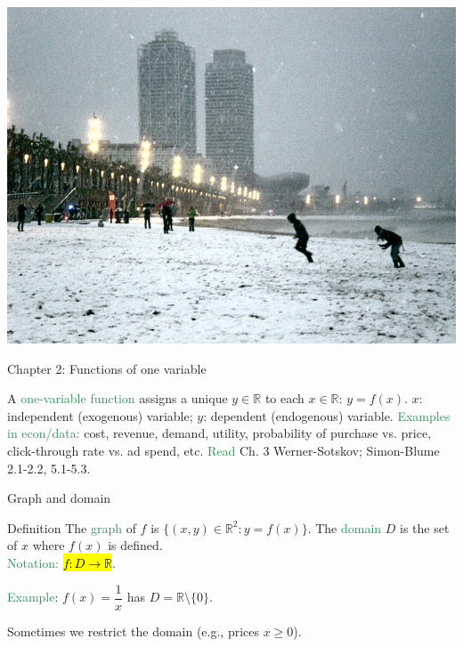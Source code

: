 \documentclass[11pt,aspectratio=169]{beamer}
\begin{document}
\begin{frame}[plain] %
  \centering\includegraphics[height=1.2\paperheight]{vbreaks/vb2.jpg}
\end{frame}





\begin{frame}{Chapter 2: Functions of one variable}

A \textcolor{SeaGreen}{one-variable function} assigns a unique $y\in\mathbb{R}$ to each $x\in\mathbb{R}$: $y=f(x)$. 
\vskip 10pt
$x$: independent (exogenous) variable; $y$: dependent (endogenous) variable.
\vskip 8pt
\textcolor{SeaGreen}{Examples in econ/data:} cost, revenue, demand, utility, probability of purchase vs. price, click-through rate vs. ad spend, etc.
\vskip 8pt
\textcolor{SeaGreen}{Read} Ch. 3 Werner-Sotskov; Simon-Blume 2.1-2.2, 5.1-5.3.
\end{frame}

\begin{frame}{Graph and domain}

\begin{block}{Definition}
The \textcolor{SeaGreen}{graph} of $f$ is $\{(x,y)\in\mathbb{R}^2: y=f(x)\}$.
\vskip 6pt
The \textcolor{SeaGreen}{domain} $D$ is the set of $x$ where $f(x)$ is defined. \\[4pt]
\textcolor{SeaGreen}{Notation:} \hl{$f:D \rightarrow \mathbb{R}$}.	
\end{block}
\bigskip

\textcolor{SeaGreen}{Example}: $f(x)=\dfrac{1}{x}$ has $D=\mathbb{R}\setminus\{0\}$. 
\smallskip

Sometimes we restrict the domain (e.g., prices $x\ge 0$).
\end{frame}
\end{document}
